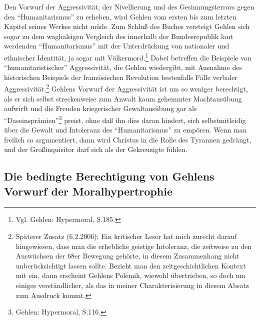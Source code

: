 \documentclass[12pt,a4paper]{article}
\begin{document}
Den Vorwurf der Aggressivität, der Nivellierung und des
Gesinnungsterrors gegen den "`Humanitarismus"' zu erheben, wird Gehlen
vom ersten bis zum letzten Kapitel seines Werkes nicht müde. Zum
Schluß des Buches versteigt Gehlen sich sogar zu dem waghalsigen
Vergleich des innerhalb der Bundesrepublik laut werdenden
"`Humanitarismus"' mit der Unterdrückung von nationaler und ethnischer
Identität, ja sogar mit Völkermord.\footnote{Vgl. Gehlen: Hypermoral,
  S.185.} Dabei betreffen die Beispiele von "`humanitaristischer"'
Aggressivität, die Gehlen wiedergibt, mit Ausnahme des historischen
Beispiels der französischen Revolution bestenfalls Fälle verbaler
Aggressivität.\footnote{Späterer Zusatz (6.2.2006): Ein kritischer Leser hat 
  mich zurecht darauf hingewiesen, dass man die erhebliche geistige
  Intoleranz, die zeitweise zu den Auswüchsen der 68er Bewegung
  gehörte, in diesem Zusammenhang nicht unberücksichtigt lassen
  sollte. Bezieht man den zeitgeschichtlichen Kontext mit ein, dann
  erscheint Gehlens Polemik, wiewohl übertrieben, so doch um einiges
  verständlicher, als das in meiner Charakterisierung in diesem Absatz
  zum Ausdruck kommt.} Gehlens Vorwurf der Aggressivität ist um so
weniger berechtigt, als er sich selbst streckenweise zum Anwalt kaum
gehemmter Machtausübung aufwirft und die Freuden kriegerischer
Gewaltausübung gar als "`Daseinsprämien"'\footnote{Gehlen: Hypermoral,
  S.116.}  preist, ohne daß ihn dies daran hindert, sich
selbstmitleidig über die Gewalt und Intoleranz des "`Humanitarismus"'
zu empören. Wenn man freilich so argumentiert, dann wird Christus in
die Rolle des Tyrannen gedrängt, und der Großinquisitor darf sich als
der Gekreuzigte fühlen.

\subsection{Die bedingte Berechtigung von Gehlens Vorwurf der Moralhypertrophie}
\end{document}
